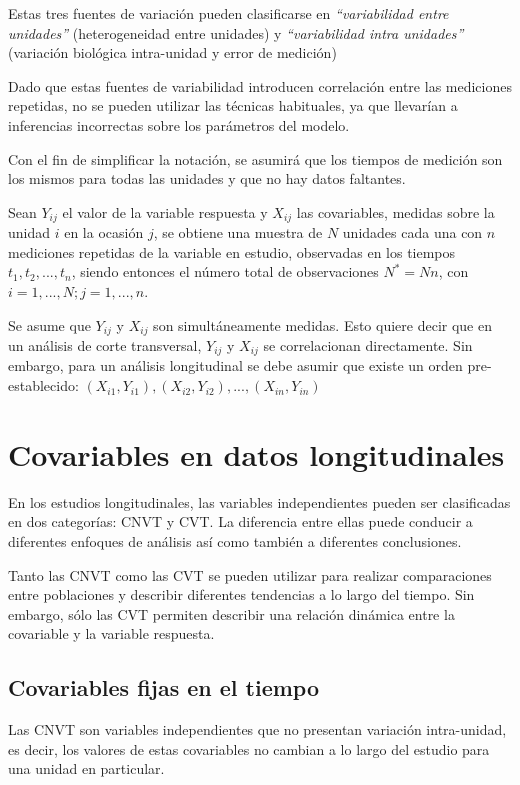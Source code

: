 \documentclass[spanish]{article}
\numberwithin{figure}{subsection}
\numberwithin{equation}{subsection}
\numberwithin{table}{subsection}
\begin{document}
Estas tres fuentes de variación pueden clasificarse en \textit{``variabilidad
entre unidades''} (heterogeneidad entre unidades) y \textit{``variabilidad
intra unidades''} (variación biológica intra-unidad y error de medición)

Dado que estas fuentes de variabilidad introducen correlación entre las
mediciones repetidas, no se pueden utilizar las técnicas habituales, ya que
llevarían a inferencias incorrectas sobre los parámetros del modelo.

Con el fin de simplificar la notación, se asumirá que los tiempos de medición
son los mismos para todas las unidades y que no hay datos faltantes.

Sean $Y_{ij}$ el valor de la variable respuesta y $X_{ij}$ las covariables,
medidas sobre la unidad $i$ en la ocasión $j$, se obtiene una muestra de $N$
unidades cada una con $n$ mediciones repetidas de la variable en estudio,
observadas en los tiempos $t_1, t_2, ..., t_n$, siendo entonces el número total
de observaciones $N^*=Nn$, con $i=1, ..., N; j=1, ..., n$.

Se asume que $Y_{ij}$ y $X_{ij}$ son simultáneamente medidas. Esto quiere decir
que en un análisis de corte transversal, $Y_{ij}$ y $X_{ij}$ se correlacionan
directamente. Sin embargo, para un análisis longitudinal se debe asumir que
existe un orden pre-establecido:
$(X_{i1}, Y_{i1}), (X_{i2}, Y_{i2}), ..., (X_{in}, Y_{in})$

\section{Covariables en datos longitudinales}

En los estudios longitudinales, las variables independientes pueden ser
clasificadas en dos categorías: CNVT y CVT. La diferencia entre
ellas puede conducir a diferentes enfoques de análisis así como también a
diferentes conclusiones.

Tanto las CNVT como las CVT se pueden utilizar para realizar comparaciones entre
poblaciones y describir diferentes tendencias a lo largo del tiempo. Sin
embargo, sólo las CVT permiten describir una relación dinámica entre la
covariable y la variable respuesta.

\subsection{Covariables fijas en el tiempo}

Las CNVT son variables independientes que no presentan variación intra-unidad,
es decir, los valores de estas covariables no cambian a lo largo del estudio
para una unidad en particular.
\end{document}
